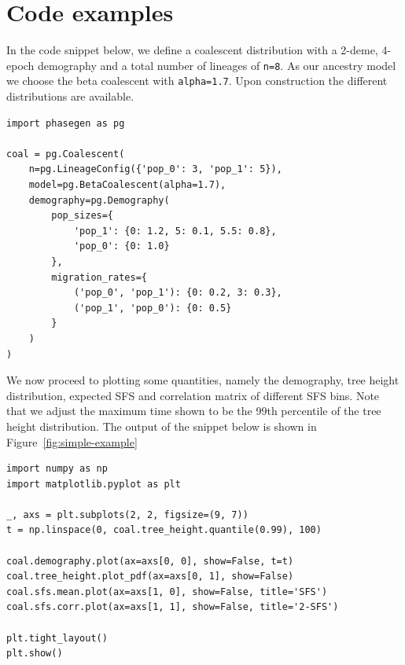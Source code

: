 \documentclass[hidelinks,11pt]{article}
\begin{document}


    \section{Code examples}\label{sec:code-examples}

    In the code snippet below, we define a coalescent distribution with a 2-deme, 4-epoch demography and a total number of lineages of \texttt{n=8}.
    As our ancestry model we choose the beta coalescent with \texttt{alpha=1.7}.
    Upon construction the different distributions are available.

    \begin{verbatim}
import phasegen as pg

coal = pg.Coalescent(
    n=pg.LineageConfig({'pop_0': 3, 'pop_1': 5}),
    model=pg.BetaCoalescent(alpha=1.7),
    demography=pg.Demography(
        pop_sizes={
            'pop_1': {0: 1.2, 5: 0.1, 5.5: 0.8},
            'pop_0': {0: 1.0}
        },
        migration_rates={
            ('pop_0', 'pop_1'): {0: 0.2, 3: 0.3},
            ('pop_1', 'pop_0'): {0: 0.5}
        }
    )
)

    \end{verbatim}

    We now proceed to plotting some quantities, namely the demography, tree height distribution, expected SFS and correlation matrix of different SFS bins.
    Note that we adjust the maximum time shown to be the 99th percentile of the tree height distribution.
    The output of the snippet below is shown in Figure~\ref{fig:simple-example}

    \begin{verbatim}
import numpy as np
import matplotlib.pyplot as plt

_, axs = plt.subplots(2, 2, figsize=(9, 7))
t = np.linspace(0, coal.tree_height.quantile(0.99), 100)

coal.demography.plot(ax=axs[0, 0], show=False, t=t)
coal.tree_height.plot_pdf(ax=axs[0, 1], show=False)
coal.sfs.mean.plot(ax=axs[1, 0], show=False, title='SFS')
coal.sfs.corr.plot(ax=axs[1, 1], show=False, title='2-SFS')

plt.tight_layout()
plt.show()
    \end{verbatim}
\end{document}
